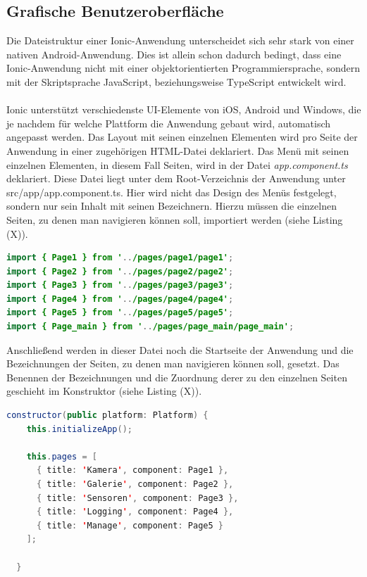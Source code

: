 \subsection{Grafische Benutzeroberfläche}

Die Dateistruktur einer Ionic-Anwendung unterscheidet sich sehr stark von einer nativen Android-Anwendung. Dies ist allein schon dadurch bedingt, dass eine Ionic-Anwendung nicht mit einer objektorientierten Programmiersprache, sondern mit der Skriptsprache JavaScript, beziehungsweise TypeScript entwickelt wird.     
\\
\\
Ionic unterstützt verschiedenste UI-Elemente von iOS, Android und Windows, die je nachdem für welche Plattform die Anwendung gebaut wird, automatisch angepasst werden. Das Layout mit seinen einzelnen Elementen wird pro Seite der Anwendung in einer zugehörigen HTML-Datei deklariert. Das Menü mit seinen einzelnen Elementen, in diesem Fall Seiten, wird in der Datei \textit{app.component.ts} deklariert. Diese Datei liegt unter dem Root-Verzeichnis der Anwendung unter src/app/app.component.ts. Hier wird nicht das Design des Menüs festgelegt, sondern nur sein Inhalt mit seinen Bezeichnern. Hierzu müssen die einzelnen Seiten, zu denen man navigieren können soll, importiert werden (siehe Listing (X)). 

\begin{lstlisting}[caption=Import der einzelnen Seiten für die Navigation in der Datei \textit{app.component.ts}, label=lst:app.component.tsImports, language=Java]
import { Page1 } from '../pages/page1/page1';
import { Page2 } from '../pages/page2/page2';
import { Page3 } from '../pages/page3/page3';
import { Page4 } from '../pages/page4/page4';
import { Page5 } from '../pages/page5/page5';
import { Page_main } from '../pages/page_main/page_main';
\end{lstlisting} 

Anschließend werden in dieser Datei noch die Startseite der Anwendung und die Bezeichnungen der Seiten, zu denen man navigieren können soll, gesetzt. Das Benennen der Bezeichnungen und die Zuordnung derer zu den einzelnen Seiten geschieht im Konstruktor (siehe Listing (X)).

\begin{lstlisting}[caption=Setzen der Bezeichnungen der einzelnen Seiten für die Navigation, label=lst:Navigationsbezeichnungen, language=Java]
constructor(public platform: Platform) {
    this.initializeApp();

    this.pages = [
      { title: 'Kamera', component: Page1 },
      { title: 'Galerie', component: Page2 },
      { title: 'Sensoren', component: Page3 },
      { title: 'Logging', component: Page4 },
      { title: 'Manage', component: Page5 }
    ];

  }
\end{lstlisting} 

